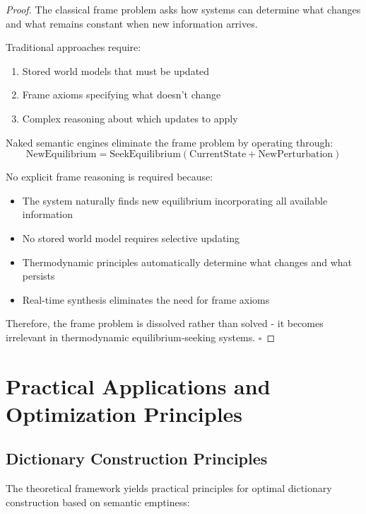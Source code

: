 \documentclass[11pt,a4paper]{article}
\begin{document}
\begin{proof}
The classical frame problem asks how systems can determine what changes and what remains constant when new information arrives.

Traditional approaches require:
\begin{enumerate}
\item Stored world models that must be updated
\item Frame axioms specifying what doesn't change  
\item Complex reasoning about which updates to apply
\end{enumerate}

Naked semantic engines eliminate the frame problem by operating through:
\begin{equation}
\text{NewEquilibrium} = \text{SeekEquilibrium}(\text{CurrentState} + \text{NewPerturbation})
\end{equation}

No explicit frame reasoning is required because:
\begin{itemize}
\item The system naturally finds new equilibrium incorporating all available information
\item No stored world model requires selective updating
\item Thermodynamic principles automatically determine what changes and what persists
\item Real-time synthesis eliminates the need for frame axioms
\end{itemize}

Therefore, the frame problem is dissolved rather than solved - it becomes irrelevant in thermodynamic equilibrium-seeking systems. $\square$
\end{proof}

\section{Practical Applications and Optimization Principles}

\subsection{Dictionary Construction Principles}

The theoretical framework yields practical principles for optimal dictionary construction based on semantic emptiness:
\end{document}
